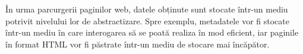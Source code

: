În urma parcurgerii paginilor web, datele obținute sunt stocate într-un mediu potrivit nivelului lor de abstractizare. Spre exemplu, metadatele vor fi stocate într-un mediu în care interogarea să se poată realiza în mod eficient, iar paginile în format HTML vor fi păstrate într-un mediu de stocare mai încăpător.
\\
